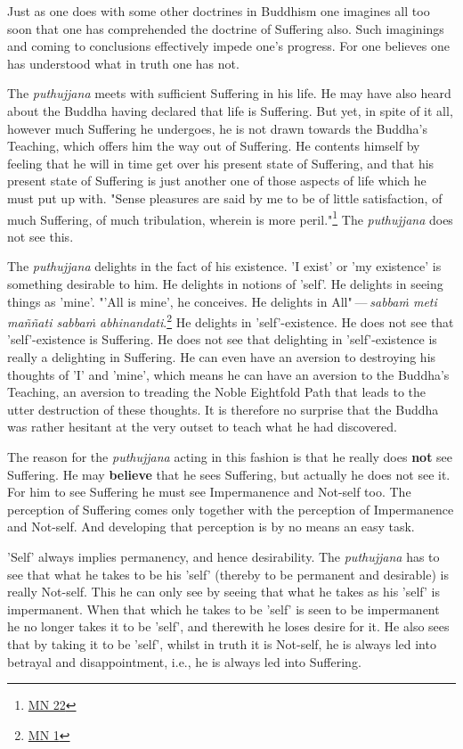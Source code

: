 Just as one does with some other doctrines in Buddhism one imagines all too soon that one has comprehended the doctrine of Suffering also. Such imaginings and coming to conclusions effectively impede one's progress. For one believes one has understood what in truth one has not.

The \emph{puthujjana} meets with sufficient Suffering in his life. He may have also heard about the Buddha having declared that life is Suffering. But yet, in spite of it all, however much Suffering he undergoes, he is not drawn towards the Buddha's Teaching, which offers him the way out of Suffering. He contents himself by feeling that he will in time get over his present state of Suffering, and that his present state of Suffering is just another one of those aspects of life which he must put up with. "Sense pleasures are said by me to be of little satisfaction, of much Suffering, of much tribulation, wherein is more peril."\footnote{\href{https://suttacentral.net/mn22/en/bodhi}{MN 22}} The \emph{puthujjana} does not see this.

The \emph{puthujjana} delights in the fact of his existence. 'I exist' or 'my existence' is something desirable to him. He delights in notions of 'self'. He delights in seeing things as 'mine'. "'All is mine', he conceives. He delights in All" --- \emph{sabbaṁ meti maññati sabbaṁ abhinandati}.\footnote{\href{https://suttacentral.net/mn1/en/bodhi}{MN 1}} He delights in 'self'-existence. He does not see that 'self'-existence is Suffering. He does not see that delighting in 'self'-existence is really a delighting in Suffering. He can even have an aversion to destroying his thoughts of 'I' and 'mine', which means he can have an aversion to the Buddha's Teaching, an aversion to treading the Noble Eightfold Path that leads to the utter destruction of these thoughts. It is therefore no surprise that the Buddha was rather hesitant at the very outset to teach what he had discovered.

The reason for the \emph{puthujjana} acting in this fashion is that he really does \textbf{not} see Suffering. He may \textbf{believe} that he sees Suffering, but actually he does not see it. For him to see Suffering he must see Impermanence and Not-self too. The perception of Suffering comes only together with the perception of Impermanence and Not-self. And developing that perception is by no means an easy task.

\protect\hypertarget{impermanent}{}{}'Self' always implies permanency, and hence desirability. The \emph{puthujjana} has to see that what he takes to be his 'self' (thereby to be permanent and desirable) is really Not-self. This he can only see by seeing that what he takes as his 'self' is impermanent. When that which he takes to be 'self' is seen to be impermanent he no longer takes it to be 'self', and therewith he loses desire for it. He also sees that by taking it to be 'self', whilst in truth it is Not-self, he is always led into betrayal and disappointment, i.e., he is always led into Suffering.

